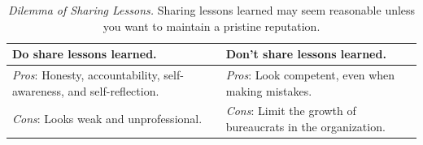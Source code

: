 

\begin{center}
\begin{table}[H] %
\begin{tabular}{ | m{\dilemmatablewidth}| m{\dilemmatablewidth} | } 
  \hline
  \textbf{Do share lessons learned.} & 
  \textbf{Don't share lessons learned.} \\ 
  \hline
  \textit{Pros}: Honesty, accountability, self-awareness, and self-reflection. & 
  \textit{Pros}: Look competent, even when making mistakes. \\  
  \hline
  \textit{Cons}: Looks weak and unprofessional. & 
  \textit{Cons}: Limit the growth of bureaucrats in the organization. \\  
  \hline
\end{tabular}
\caption{
\textit{Dilemma of Sharing Lessons.}
Sharing lessons learned may seem reasonable unless you want to maintain a pristine reputation. 
}
\label{table:dilemma-sharing-lessons-learned}
\end{table}
\end{center}



